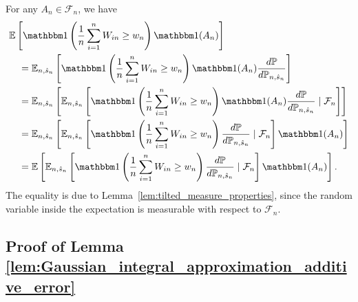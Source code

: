 \documentclass[12pt]{article}
\theoremstyle{definition}
\def\P{\mathbb{P}}
\def\P{\mathbb{P}}
\newcommand{\E}{\mathbb E}								%
\renewcommand{\P}{\mathbb{P}}							%
\newcommand{\indicator}{\mathbbm 1}						%
\begin{document}
For any $A_n \in \mathcal F_n$, we have
\begin{equation*}
\begin{split}
&\E\left[\indicator\left(\frac{1}{n}\sum_{i = 1}^n W_{in} \geq w_n\right)\indicator(A_n)\right] \\
&\quad = \E_{n, \hat s_n}\left[\indicator\left(\frac{1}{n}\sum_{i = 1}^n W_{in} \geq w_n\right)\indicator(A_n)\frac{d\P}{d\P_{n, \hat s_n}}\right] \\
&\quad = \E_{n, \hat s_n}\left[\E_{n, \hat s_n}\left[\indicator\left(\frac{1}{n}\sum_{i = 1}^n W_{in} \geq w_n\right)\indicator(A_n)\frac{d\P}{d\P_{n, \hat s_n}} \mid \mathcal F_n\right] \right] \\
&\quad = \E_{n, \hat s_n}\left[\E_{n, \hat s_n}\left[\indicator\left(\frac{1}{n}\sum_{i = 1}^n W_{in} \geq w_n\right)\frac{d\P}{d\P_{n, \hat s_n}} \mid \mathcal F_n\right] \indicator(A_n) \right] \\
&\quad = \E\left[\E_{n, \hat s_n}\left[\indicator\left(\frac{1}{n}\sum_{i = 1}^n W_{in} \geq w_n\right)\frac{d\P}{d\P_{n, \hat s_n}} \mid \mathcal F_n\right] \indicator(A_n) \right].
\end{split}
\end{equation*}
The equality is due to Lemma~\ref{lem:tilted_measure_properties}, since the random variable inside the expectation is measurable with respect to $\mathcal F_n$.



\subsection{Proof of Lemma \ref{lem:Gaussian_integral_approximation_additive_error}}
\end{document}
